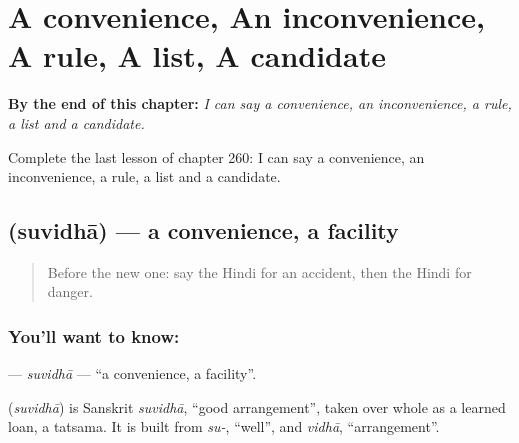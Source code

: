 
\chapter{A convenience, An inconvenience, A rule, A list, A candidate}
\label{ch:hi-a-convenience-an-inconvenience-a-rule-a-list-a-candidate}

\begin{chapteropening}
\textbf{By the end of this chapter:} \emph{I can say a convenience, an inconvenience, a rule, a list and a candidate.}

Complete the last lesson of chapter 260: I can say a convenience, an inconvenience, a rule, a list and a candidate.
\end{chapteropening}

\section[\texorpdfstring{\hi{सुविधा} (suvidhā)}{सुविधा (suvidhā)}]{ (suvidhā) — a convenience, a facility}

\label{lesson:HI-C260-suvidha}



\begin{quote}
Before the new one: say the Hindi for an accident, then the Hindi for danger.
\end{quote}

\subsection*{You'll want to know: }
\textbf{} — \emph{suvidhā} — \textquotedblleft{}a convenience, a facility\textquotedblright{}.

\begin{cousinweb}
\textbf{} (\emph{suvidhā}) is Sanskrit \emph{suvidhā}, \textquotedblleft{}good arrangement\textquotedblright{}, taken over whole as a learned loan, a tatsama. It is built from \emph{su-}, \textquotedblleft{}well\textquotedblright{}, and \emph{vidhā}, \textquotedblleft{}arrangement\textquotedblright{}.
\end{cousinweb}

